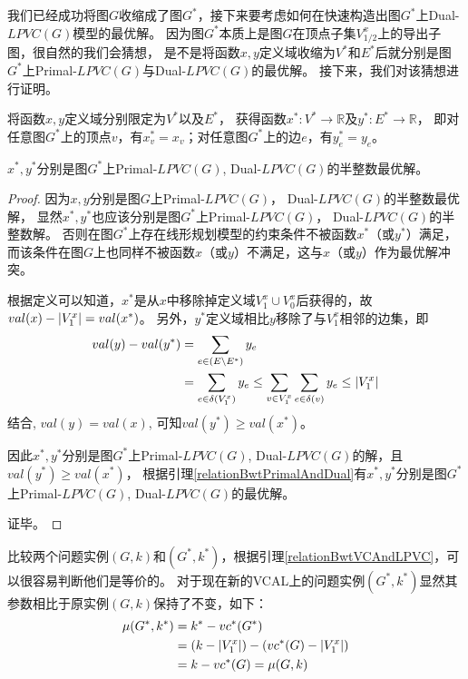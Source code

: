 我们已经成功将图$G$收缩成了图$G^*$，接下来要考虑如何在快速构造出图$G^*$上Dual-$LPVC(G)$模型的最优解。
因为图$G^*$本质上是图$G$在顶点子集$V^x_{1/2}$上的导出子图，很自然的我们会猜想，
是不是将函数$x,y$定义域收缩为$V^*$和$E^*$后就分别是图$G^*$上Primal-$LPVC(G)$与Dual-$LPVC(G)$的最优解。
接下来，我们对该猜想进行证明。

将函数$x,y$定义域分别限定为$V^*$以及$E^*$，
获得函数$x^*:V^* \rightarrow \mathbb{R}$及$y^*:E^* \rightarrow \mathbb{R}$，
即对任意图$G^*$上的顶点$v$，有$x^*_v=x_v$；对任意图$G^*$上的边$e$，有$y^*_e=y_e$。
\begin{claim}
$x^*, y^*$分别是图$G^*$上Primal-$LPVC(G)$, Dual-$LPVC(G)$的半整数最优解。
\end{claim}
\begin{proof}
因为$x, y$分别是图$G$上Primal-$LPVC(G)$， Dual-$LPVC(G)$的半整数最优解，
显然$x^*, y^*$也应该分别是图$G^*$上Primal-$LPVC(G)$， Dual-$LPVC(G)$的半整数解。
否则在图$G^*$上存在线形规划模型的约束条件不被函数$x^*$（或$y^*$）满足，而该条件在图$G$上也同样不被函数$x$（或$y$）不满足，这与$x$（或$y$）作为最优解冲突。

根据定义可以知道，$x^*$是从$x$中移除掉定义域$V^x_1 \cup V^x_0$后获得的，故$val(x) - \left\vert V^x_1 \right\vert = val(x^*)$。
另外，$y^*$定义域相比$y$移除了与$V^x_1$相邻的边集，即
\begin{equation*} \begin{aligned}
val(y) - val(y^*) & = \sum_{e \in (E \setminus E^*)}{y_e}
\\ & = \sum_{e \in \delta(V^x_1)}{y_e}  \le \sum_{v \in V^x_1}{\sum_{e \in \delta(v)}{y_e}}\le\left\vert V^x_1 \right\vert
\end{aligned}\end{equation*}
结合, $val(y) = val(x)$, 可知$val(y^*) \ge val(x^*)$。

因此$x^*, y^*$分别是图$G^*$上Primal-$LPVC(G)$, Dual-$LPVC(G)$的解，且$val(y^*) \ge val(x^*)$，
根据引理\ref{relationBwtPrimalAndDual}有$x^*, y^*$分别是图$G^*$上Primal-$LPVC(G)$, Dual-$LPVC(G)$的最优解。

证毕。
\end{proof}

比较两个问题实例$(G, k)$和$(G^*, k^*)$，根据引理\ref{relationBwtVCAndLPVC}，可以很容易判断他们是等价的。
对于现在新的VCAL上的问题实例$(G^*, k^*)$显然其参数相比于原实例$(G, k)$保持了不变，如下：
\begin{equation*} \begin{aligned}
  \mu(G^*, k^*) &= k^* - vc^*(G^*) \\
                &= (k - \left\vert V^x_1 \right\vert) - (vc^*(G) - \left\vert V^x_1 \right\vert) \\
                &= k - vc^*(G) = \mu(G, k)
\end{aligned} \end{equation*}

